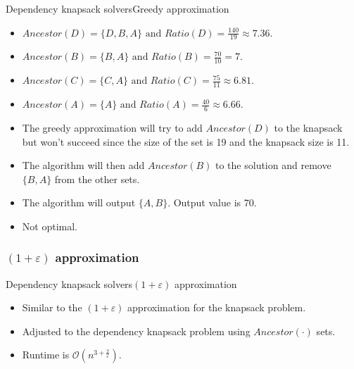 \documentclass{beamer}
\begin{document}
\begin{frame}{Dependency knapsack solvers}{Greedy approximation} %
    \begin{example}
         \begin{itemize}
            \item {$ Ancestor(D) = \{D,B,A\} \text{ and } 
            Ratio(D) = \frac{140}{19} \approx 7.36$.}
            \item {$ Ancestor(B) = \{B,A\} \text{ and } 
            Ratio(B) = \frac{70}{10} = 7$.}
            \item {$ Ancestor(C) = \{C,A\} \text{ and } 
            Ratio(C) = \frac{75}{11} \approx 6.81$.}
            \item {$ Ancestor(A) = \{A\} \text{ and } 
            Ratio(A) = \frac{40}{6} \approx 6.66$.}
            \item {The greedy approximation will try to add $Ancestor(D)$
             to the knapsack but won't succeed since the size of the set 
             is 19 and the knapsack size is 11.}
            \item {The algorithm will then add $Ancestor(B)$ to the 
            solution and remove $\{B,A\}$ from the other sets.}
            \item {The algorithm will output $\{A,B\}$. Output value 
            is 70.}
            \item {Not optimal.}
        \end{itemize}
    \end{example}
\end{frame}

\subsubsection*{$(1+\varepsilon)$ approximation}

\begin{frame}{Dependency knapsack solvers}{$(1+\varepsilon)$ approximation}
    \begin{itemize}
        \item {Similar to the $(1+\varepsilon)$ approximation for the 
        knapsack problem.}
        \item {Adjusted to the dependency knapsack problem using 
        $Ancestor(\cdot)$ sets.}
        \item {Runtime is $\mathcal{O}(n^{3+\frac{2}{\varepsilon}})$.}
    \end{itemize}
\end{frame}
\end{document}
